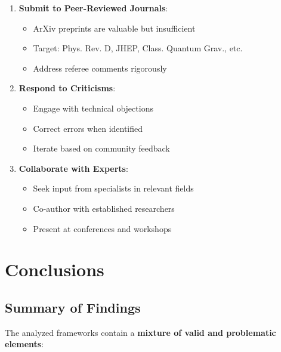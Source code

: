 \begin{enumerate}
    \item \textbf{Submit to Peer-Reviewed Journals}:
    \begin{itemize}
        \item ArXiv preprints are valuable but insufficient
        \item Target: Phys. Rev. D, JHEP, Class. Quantum Grav., etc.
        \item Address referee comments rigorously
    \end{itemize}

    \item \textbf{Respond to Criticisms}:
    \begin{itemize}
        \item Engage with technical objections
        \item Correct errors when identified
        \item Iterate based on community feedback
    \end{itemize}

    \item \textbf{Collaborate with Experts}:
    \begin{itemize}
        \item Seek input from specialists in relevant fields
        \item Co-author with established researchers
        \item Present at conferences and workshops
    \end{itemize}
\end{enumerate}

\section{Conclusions}

\subsection{Summary of Findings}

The analyzed frameworks contain a \textbf{mixture of valid and problematic elements}:

